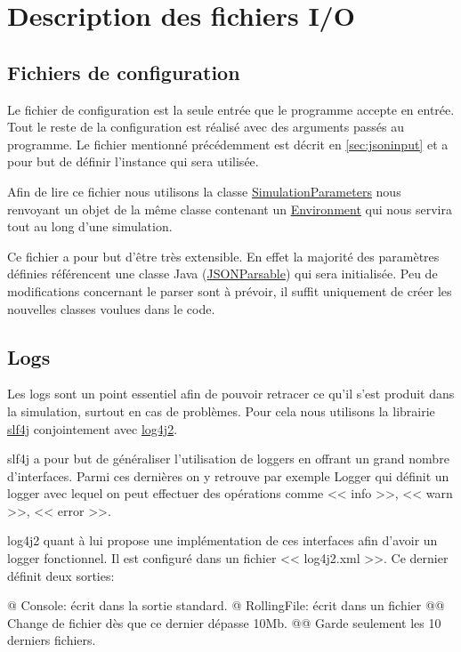 \documentclass[final]{polytech/polytech}
\newcommand{\klass}[1]{\hyperref[class:#1]{#1}}
\begin{document}
	\section{Description des fichiers I/O}
		\subsection{Fichiers de configuration}
			Le fichier de configuration est la seule entrée que le programme accepte en entrée.
			Tout le reste de la configuration est réalisé avec des arguments passés au programme.
			Le fichier mentionné précédemment est décrit en \autoref{sec:jsoninput} et a pour but de définir l'instance qui sera utilisée.
			
			Afin de lire ce fichier nous utilisons la classe \klass{SimulationParameters} nous renvoyant un objet de la même classe contenant un \klass{Environment} qui nous servira tout au long d'une simulation.
			
			Ce fichier a pour but d'être très extensible.
			En effet la majorité des paramètres définies référencent une classe Java (\klass{JSONParsable}) qui sera initialisée.
			Peu de modifications concernant le parser sont à prévoir, il suffit uniquement de créer les nouvelles classes voulues dans le code.
			
		\subsection{Logs}
			Les logs sont un point essentiel afin de pouvoir retracer ce qu'il s'est produit dans la simulation, surtout en cas de problèmes.
			Pour cela nous utilisons la librairie \href{https://www.slf4j.org/}{slf4j} conjointement avec \href{https://logging.apache.org/log4j/2.x/}{log4j2}.
			
			slf4j a pour but de généraliser l'utilisation de loggers en offrant un grand nombre d'interfaces.
			Parmi ces dernières on y retrouve par exemple Logger qui définit un logger avec lequel on peut effectuer des opérations comme << info >>, << warn >>, << error >>.
			
			log4j2 quant à lui propose une implémentation de ces interfaces afin d'avoir un logger fonctionnel.
			Il est configuré dans un fichier << log4j2.xml >>.
			Ce dernier définit deux sorties:
			\begin{easylist}
				@ Console: écrit dans la sortie standard.
				@ RollingFile: écrit dans un fichier
				@@ Change de fichier dès que ce dernier dépasse 10Mb.
				@@ Garde seulement les 10 derniers fichiers.
			\end{easylist}
			
\end{document}
